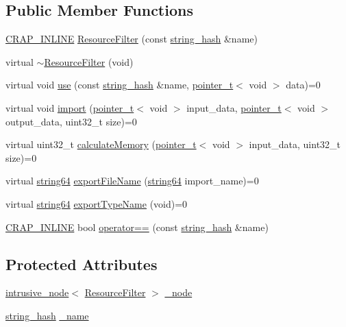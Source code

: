 \subsection*{Public Member Functions}
\begin{DoxyCompactItemize}
\item 
\hyperlink{config__x86_8h_a5a40526b8d842e7ff731509998bb0f1c}{C\+R\+A\+P\+\_\+\+I\+N\+L\+I\+N\+E} \hyperlink{classcrap_1_1_resource_filter_af16fde84f2eb9ddec468b45cf9913bea}{Resource\+Filter} (const \hyperlink{classcrap_1_1string__hash}{string\+\_\+hash} \&name)
\item 
virtual \hyperlink{classcrap_1_1_resource_filter_aa3549608f0f033aa79230669e33b9637}{$\sim$\+Resource\+Filter} (void)
\item 
virtual void \hyperlink{classcrap_1_1_resource_filter_a1f5cc743b14021977727db2564082c72}{use} (const \hyperlink{classcrap_1_1string__hash}{string\+\_\+hash} \&name, \hyperlink{structcrap_1_1pointer__t}{pointer\+\_\+t}$<$ void $>$ data)=0
\item 
virtual void \hyperlink{classcrap_1_1_resource_filter_ad17609fc71bb6d2825b99812d1d6eef4}{import} (\hyperlink{structcrap_1_1pointer__t}{pointer\+\_\+t}$<$ void $>$ input\+\_\+data, \hyperlink{structcrap_1_1pointer__t}{pointer\+\_\+t}$<$ void $>$ output\+\_\+data, uint32\+\_\+t size)=0
\item 
virtual uint32\+\_\+t \hyperlink{classcrap_1_1_resource_filter_ac02efd4c496384cda5a906a9168925c6}{calculate\+Memory} (\hyperlink{structcrap_1_1pointer__t}{pointer\+\_\+t}$<$ void $>$ input\+\_\+data, uint32\+\_\+t size)=0
\item 
virtual \hyperlink{namespacecrap_a2b8a7358804e1a9c3c32f12d8cdcfdf8}{string64} \hyperlink{classcrap_1_1_resource_filter_a2d264df875e440015fd05de4c5b96aa8}{export\+File\+Name} (\hyperlink{namespacecrap_a2b8a7358804e1a9c3c32f12d8cdcfdf8}{string64} import\+\_\+name)=0
\item 
virtual \hyperlink{namespacecrap_a2b8a7358804e1a9c3c32f12d8cdcfdf8}{string64} \hyperlink{classcrap_1_1_resource_filter_a453f47cae8bc4024fb4de89a2924a1aa}{export\+Type\+Name} (void)=0
\item 
\hyperlink{config__x86_8h_a5a40526b8d842e7ff731509998bb0f1c}{C\+R\+A\+P\+\_\+\+I\+N\+L\+I\+N\+E} bool \hyperlink{classcrap_1_1_resource_filter_a7e89a3e7e7ac7497eb679657def798c8}{operator==} (const \hyperlink{classcrap_1_1string__hash}{string\+\_\+hash} \&name)
\end{DoxyCompactItemize}
\subsection*{Protected Attributes}
\begin{DoxyCompactItemize}
\item 
\hyperlink{classcrap_1_1intrusive__node}{intrusive\+\_\+node}$<$ \hyperlink{classcrap_1_1_resource_filter}{Resource\+Filter} $>$ \hyperlink{classcrap_1_1_resource_filter_ae5724fd4f42bcd4ebe9e84ac1c9caf1c}{\+\_\+node}
\item 
\hyperlink{classcrap_1_1string__hash}{string\+\_\+hash} \hyperlink{classcrap_1_1_resource_filter_a53a73f6d9c295c74e36d62a51e106b54}{\+\_\+name}
\end{DoxyCompactItemize}


